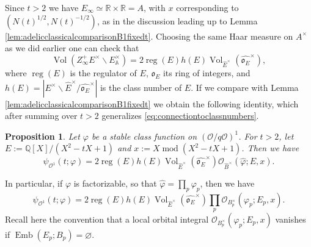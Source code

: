 \documentclass{article}
\newtheorem{prop}[lem]{Proposition}
\theoremstyle{named}
\newcommand{\A}{\mathbb{A}}
\newcommand{\Q}{\mathbb{Q}}
\newcommand{\R}{\mathbb{R}}
\renewcommand{\O}{\mathcal{O}}
\renewcommand{\o}{\mathfrak{o}}
\DeclareMathOperator{\vol}{Vol}
\DeclareMathOperator{\reg}{reg}
\DeclareMathOperator{\modulo}{mod}
\DeclareMathOperator{\Emb}{Emb}
\begin{document}
Since $t > 2$ we have $E_\infty \simeq \R \times \R = A$, with $x$ corresponding to $(N(t)^{1/2}, N(t)^{-1/2})$, as in the discussion leading up to Lemma \ref{lem:adelicclassicalcomparisonB1fixedt}. Choosing the same Haar measure on $A^\times$ as we did earlier one can check that
\begin{equation*}
    \vol(Z_\infty^+ E^\times \backslash E_\A^\times) = 2\reg(E) h(E) \vol_{\widehat{E}^\times}(\widehat{\o_{E}}^\times),
\end{equation*}
where $\reg(E)$ is the regulator of $E$, $\o_{E}$ its ring of integers, and $h(E) = |E^\times \backslash \widehat{E}^\times/\widehat{\o_E}^\times|$ is the class number of $E$. If we compare with Lemma \ref{lem:adelicclassicalcomparisonB1fixedt} we obtain the following identity, which after summing over $t > 2$ generalizes \eqref{eq:connectiontoclassnumbers}. 

\begin{prop}\label{prop:expressionchebyshevprimegeodesic}
Let $\varphi$ be a stable class function on $(\O/q\O)^1$. For $t> 2$, let $E := \Q[X]/(X^2 - tX + 1)$ and $x := X \modulo (X^2 - tX + 1)$.
Then we have
\begin{equation*}
\psi_{\O^1}(t; \varphi) =
    2\reg(E) h(E) \vol_{\widehat{E}^\times}(\widehat{\o_{E}}^\times)\O_{\widehat{B}^\times}(\widehat{\varphi}; E, x).
\end{equation*}
\end{prop}
In particular, if $\varphi$ is factorizable, so that $\widehat{\varphi} = \prod_p \varphi_p$, then we have
\begin{equation*}
    \psi_{\O^1}(t; \varphi) = 2\reg(E) h(E) \vol_{\widehat{E}^\times}(\widehat{\o_{E}}^\times)\prod_p \O_{B_p^\times}(\varphi_p; E_p, x).
\end{equation*}
Recall here the convention that a local orbital integral $\O_{B_p^\times}(\varphi_p; E_p, x)$ vanishes if $\Emb(E_p; B_p) = \varnothing$. 
\end{document}
